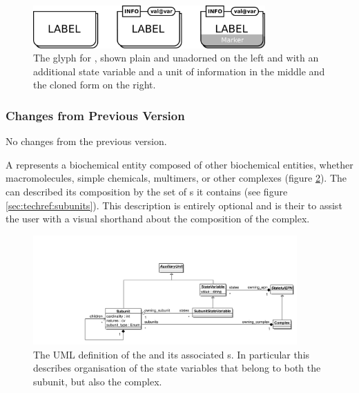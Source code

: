 \begin{figure}[htb]
  \centering
  \includegraphics[width = 3.5in]{images/geneticMultimer}
  \caption{The \PD glyph for , shown plain and
    unadorned on the left and with an additional state variable and a
    unit of information in the middle and the cloned form on the right.}
  \label{fig:techref:genetic-multimer}
\end{figure}

\subsubsection{Changes from Previous Version}

No changes from the previous version.


\label{sec:techref:complex}
\label{defn:Complex}

A  represents a biochemical entity composed of
other biochemical entities, whether macromolecules, simple chemicals,
multimers, or other complexes (figure
\ref{fig:techref:complexsubunituml}). The  can described
its composition by the set of s it contains (see
figure \ref{sec:techref:subunits}). This description is entirely optional and
is their to assist the user with a visual shorthand about the
composition of the complex.

\begin{figure}[htb]
  \centering
  \includegraphics[width = 0.9\textwidth]{images/complexsubunituml}
  \caption{The UML definition of the  and its
    associated s. In particular this describes organisation
   of the state variables that belong to both the subunit, but also
   the complex.}
  \label{fig:techref:complexsubunituml}
\end{figure}

